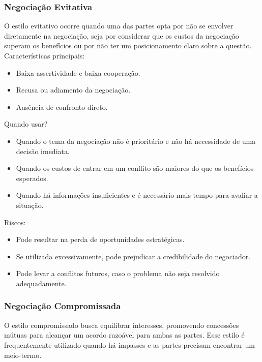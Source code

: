 \documentclass[article,12pt,oneside,a4paper]{article}
\begin{document}
\subsubsection{Negociação Evitativa}
\label{sec:org0719a16}

O estilo evitativo ocorre quando uma das partes opta por não se envolver diretamente na negociação, seja por considerar que os custos da negociação superam os benefícios ou por não ter um posicionamento claro sobre a questão. \\

Características principais:

\begin{itemize}
\item Baixa assertividade e baixa cooperação.
\item Recusa ou adiamento da negociação.
\item Ausência de confronto direto.
\end{itemize}

Quando usar?

\begin{itemize}
\item Quando o tema da negociação não é prioritário e não há necessidade de uma decisão imediata.
\item Quando os custos de entrar em um conflito são maiores do que os benefícios esperados.
\item Quando há informações insuficientes e é necessário mais tempo para avaliar a situação.
\end{itemize}

Riscos:

\begin{itemize}
\item Pode resultar na perda de oportunidades estratégicas.
\item Se utilizada excessivamente, pode prejudicar a credibilidade do negociador.
\item Pode levar a conflitos futuros, caso o problema não seja resolvido adequadamente.
\end{itemize}
\subsubsection{Negociação Compromissada}
\label{sec:orgf46e76e}

O estilo compromissado busca equilibrar interesses, promovendo concessões mútuas para alcançar um acordo razoável para ambas as partes. Esse estilo é frequentemente utilizado quando há impasses e as partes precisam encontrar um meio-termo. \\
\end{document}
